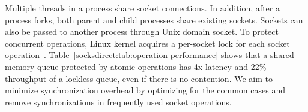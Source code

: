 Multiple threads in a process share socket connections. In addition, after a process forks, both parent and child processes share existing sockets. Sockets can also be passed to another process through Unix domain socket. To protect concurrent operations, Linux kernel acquires a per-socket lock for each socket operation~\cite{boyd2010analysis,han2012megapipe,lin2016scalable}. Table~\ref{socksdirect:tab:operation-performance} shows that a shared memory queue protected by atomic operations has 4x latency and 22\% throughput of a lockless queue, even if there is no contention.
We aim to minimize synchronization overhead by optimizing for the common cases and remove synchronizations in frequently used socket operations.







